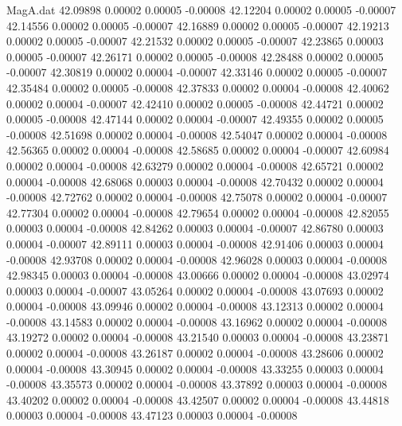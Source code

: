 \begin{filecontents}{MagA.dat}
  42.09898    0.00002    0.00005   -0.00008
  42.12204    0.00002    0.00005   -0.00007
  42.14556    0.00002    0.00005   -0.00007
  42.16889    0.00002    0.00005   -0.00007
  42.19213    0.00002    0.00005   -0.00007
  42.21532    0.00002    0.00005   -0.00007
  42.23865    0.00003    0.00005   -0.00007
  42.26171    0.00002    0.00005   -0.00008
  42.28488    0.00002    0.00005   -0.00007
  42.30819    0.00002    0.00004   -0.00007
  42.33146    0.00002    0.00005   -0.00007
  42.35484    0.00002    0.00005   -0.00008
  42.37833    0.00002    0.00004   -0.00008
  42.40062    0.00002    0.00004   -0.00007
  42.42410    0.00002    0.00005   -0.00008
  42.44721    0.00002    0.00005   -0.00008
  42.47144    0.00002    0.00004   -0.00007
  42.49355    0.00002    0.00005   -0.00008
  42.51698    0.00002    0.00004   -0.00008
  42.54047    0.00002    0.00004   -0.00008
  42.56365    0.00002    0.00004   -0.00008
  42.58685    0.00002    0.00004   -0.00007
  42.60984    0.00002    0.00004   -0.00008
  42.63279    0.00002    0.00004   -0.00008
  42.65721    0.00002    0.00004   -0.00008
  42.68068    0.00003    0.00004   -0.00008
  42.70432    0.00002    0.00004   -0.00008
  42.72762    0.00002    0.00004   -0.00008
  42.75078    0.00002    0.00004   -0.00007
  42.77304    0.00002    0.00004   -0.00008
  42.79654    0.00002    0.00004   -0.00008
  42.82055    0.00003    0.00004   -0.00008
  42.84262    0.00003    0.00004   -0.00007
  42.86780    0.00003    0.00004   -0.00007
  42.89111    0.00003    0.00004   -0.00008
  42.91406    0.00003    0.00004   -0.00008
  42.93708    0.00002    0.00004   -0.00008
  42.96028    0.00003    0.00004   -0.00008
  42.98345    0.00003    0.00004   -0.00008
  43.00666    0.00002    0.00004   -0.00008
  43.02974    0.00003    0.00004   -0.00007
  43.05264    0.00002    0.00004   -0.00008
  43.07693    0.00002    0.00004   -0.00008
  43.09946    0.00002    0.00004   -0.00008
  43.12313    0.00002    0.00004   -0.00008
  43.14583    0.00002    0.00004   -0.00008
  43.16962    0.00002    0.00004   -0.00008
  43.19272    0.00002    0.00004   -0.00008
  43.21540    0.00003    0.00004   -0.00008
  43.23871    0.00002    0.00004   -0.00008
  43.26187    0.00002    0.00004   -0.00008
  43.28606    0.00002    0.00004   -0.00008
  43.30945    0.00002    0.00004   -0.00008
  43.33255    0.00003    0.00004   -0.00008
  43.35573    0.00002    0.00004   -0.00008
  43.37892    0.00003    0.00004   -0.00008
  43.40202    0.00002    0.00004   -0.00008
  43.42507    0.00002    0.00004   -0.00008
  43.44818    0.00003    0.00004   -0.00008
  43.47123    0.00003    0.00004   -0.00008

\end{filecontents}
